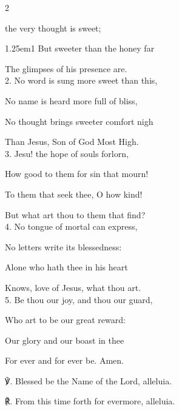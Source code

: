 \firstEvensongHymn\label{HolyNameEvensongHymn}
\begin{multicols}{2}
	
 the very thought is sweet;

\begin{hangparas}{1.25em}{1}
But sweeter than the honey far

The glimpses of his presence are.\\

2. No word is sung more sweet than this,

No name is heard more full of bliss,

No thought brings sweeter comfort nigh

Than Jesus, Son of God Most High.\\

3. Jesu! the hope of souls forlorn,

How good to them for sin that mourn!

To them that seek thee, O how kind!

But what art thou to them that find?\\

4. No tongue of mortal can express,

No letters write its blessedness: 

Alone who hath thee in his heart

Knows, love of Jesus, what thou art.\\

5. Be thou our joy, and thou our guard,

Who art to be our great reward:

Our glory and our boast in thee

For ever and for ever be. Amen.\\
\end{hangparas}

℣. Blessed be the Name of the Lord, alleluia.

℟. From this time forth for evermore, alleluia.

\end{multicols}

\clearpage
\mattins


